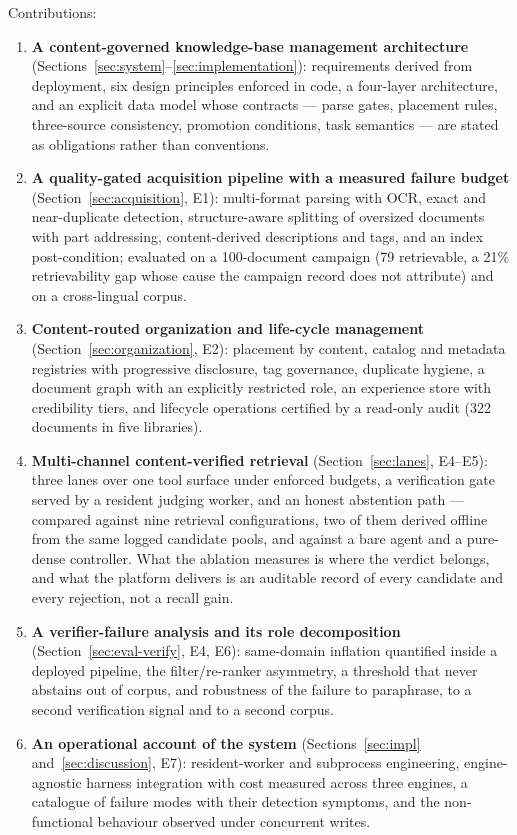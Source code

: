\noindent Contributions:
\begin{enumerate}
\item \textbf{A content-governed knowledge-base management architecture}
(Sections~\ref{sec:system}--\ref{sec:implementation}): requirements derived
from deployment, six design principles enforced in code, a four-layer
architecture, and an explicit data model whose contracts --- parse gates,
placement rules, three-source consistency, promotion conditions, task
semantics --- are stated as obligations rather than conventions.
\item \textbf{A quality-gated acquisition pipeline with a measured failure
budget} (Section~\ref{sec:acquisition}, E1): multi-format parsing with OCR,
exact and near-duplicate detection, structure-aware splitting of oversized
documents with part addressing, content-derived descriptions and tags, and an
index post-condition; evaluated on a 100-document campaign (79 retrievable,
a 21\% retrievability gap whose cause the campaign record does not
attribute) and on a cross-lingual corpus.
\item \textbf{Content-routed organization and life-cycle management}
(Section~\ref{sec:organization}, E2): placement by content, catalog and
metadata registries with progressive disclosure, tag governance, duplicate
hygiene, a document graph with an explicitly restricted role, an experience
store with credibility tiers, and lifecycle operations certified by a
read-only audit (322 documents in five libraries).
\item \textbf{Multi-channel content-verified retrieval} (Section~\ref{sec:lanes},
E4--E5): three lanes over one tool surface under enforced budgets, a
verification gate served by a resident judging worker, and an honest
abstention path --- compared against nine retrieval configurations, two of
them derived offline from the same logged candidate pools, and against a
bare agent and a pure-dense controller. What the ablation measures is where
the verdict belongs, and what the platform delivers is an auditable record of
every candidate and every rejection, not a recall gain.
\item \textbf{A verifier-failure analysis and its role decomposition}
(Section~\ref{sec:eval-verify}, E4, E6): same-domain inflation quantified
inside a deployed pipeline, the filter/re-ranker asymmetry, a threshold that
never abstains out of corpus, and robustness of the failure to paraphrase, to
a second verification signal and to a second corpus.
\item \textbf{An operational account of the system} (Sections~\ref{sec:impl}
and~\ref{sec:discussion}, E7): resident-worker and subprocess engineering,
engine-agnostic harness integration with cost measured across three engines,
a catalogue of failure modes with their detection symptoms, and the
non-functional behaviour observed under concurrent writes.
\end{enumerate}

